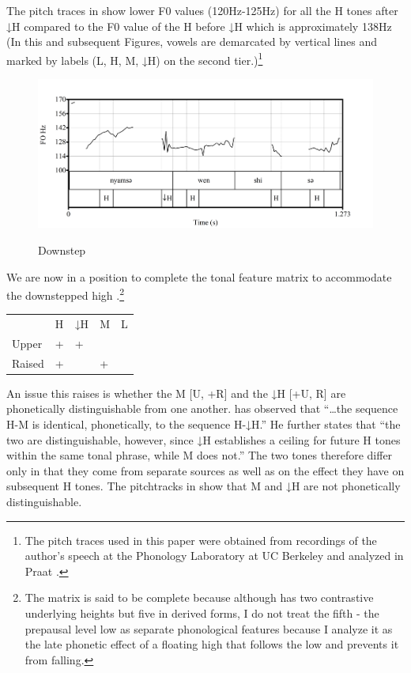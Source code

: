 \documentclass[output=paper,modfonts,nonflat,
colorlinks, citecolor=brown,
draftmode
]{langsci/langscibook}
\begin{document}
\ea\label{ex:akumbu:20}
\z

The pitch traces in  show lower F0 values (120Hz-125Hz) for all the H tones after ↓H compared to the F0 value of the H  before ↓H which is approximately 138Hz (In this and subsequent Figures, vowels are demarcated by vertical lines and marked by  labels (L, H, M, ↓H) on the second tier.)\footnote{The pitch traces used in this paper were obtained from recordings of the author’s speech at the Phonology Laboratory at UC Berkeley and analyzed in Praat \citep{Boersma2016}.}

\begin{figure}	
	{\includegraphics[width=\textwidth]{figures/fig-akumbu-1}}
	\caption{Downstep}\label{fig:akumbu:1}	
\end{figure}

We are now in a position to complete the tonal feature matrix to accommodate the downstepped high .\footnote{The matrix is said to be complete because although  has two contrastive underlying  heights but five in derived forms, I do not treat the fifth - the prepausal level low  as separate phonological  features because I analyze it as the late phonetic effect of a floating high  that follows the low  and prevents it from falling.} 

\ea\label{ex:akumbu:21}
\begin{tabular}[t]{lllll}
	&			H&	↓H&	M&	L\\
	Upper&		+&	+&	\textminus&	\textminus\\
	Raised&		+&	\textminus&	+&	\textminus\\
\end{tabular}
\z

An issue this raises is whether the M  [\textminus U, +R] and the ↓H  [+U, \textminus R] are phonetically distinguishable from one another. \citet[162]{Hyman1979babanki} has observed that “…the sequence H-M is identical, phonetically, to the sequence H-↓H.” He further states that “the two are distinguishable, however, since ↓H establishes a ceiling for future H tones within the same tonal phrase, while M does not.” The two tones therefore differ only in that they come from separate sources as well as on the effect they have on subsequent H tones. The pitchtracks in  show that M and ↓H are not phonetically distinguishable. 
\end{document}
